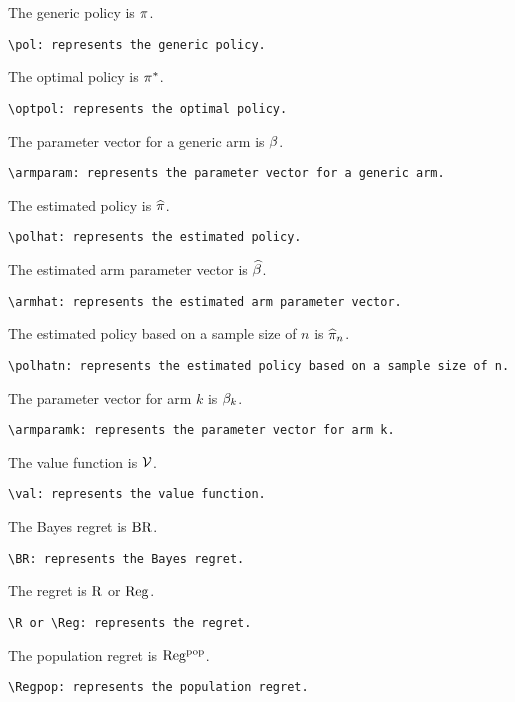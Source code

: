 \documentclass{article}
\begin{document}
The generic policy is $\pi$.
\begin{verbatim}
\pol: represents the generic policy.
\end{verbatim}

The optimal policy is $\pi^{*}$.
\begin{verbatim}
\optpol: represents the optimal policy.
\end{verbatim}

The parameter vector for a generic arm is $\beta$.
\begin{verbatim}
\armparam: represents the parameter vector for a generic arm.
\end{verbatim}

The estimated policy is $\widehat{\pi}$.
\begin{verbatim}
\polhat: represents the estimated policy.
\end{verbatim}

The estimated arm parameter vector is $\widehat{\beta}$.
\begin{verbatim}
\armhat: represents the estimated arm parameter vector.
\end{verbatim}

The estimated policy based on a sample size of $n$ is $\widehat{\pi}_{n}$.
\begin{verbatim}
\polhatn: represents the estimated policy based on a sample size of n.
\end{verbatim}

The parameter vector for arm $k$ is $\beta_{k}$.
\begin{verbatim}
\armparamk: represents the parameter vector for arm k.
\end{verbatim}

The value function is $\operatorname{{\mathcal{V} }}$.
\begin{verbatim}
\val: represents the value function.
\end{verbatim}

The Bayes regret is $\operatorname{BR}$.
\begin{verbatim}
\BR: represents the Bayes regret.
\end{verbatim}

The regret is $\operatorname{\rm R}$ or $\operatorname{\rm Reg}$.
\begin{verbatim}
\R or \Reg: represents the regret.
\end{verbatim}

The population regret is $\operatorname{\rm Reg^{pop}}$.
\begin{verbatim}
\Regpop: represents the population regret.
\end{verbatim}
\end{document}
